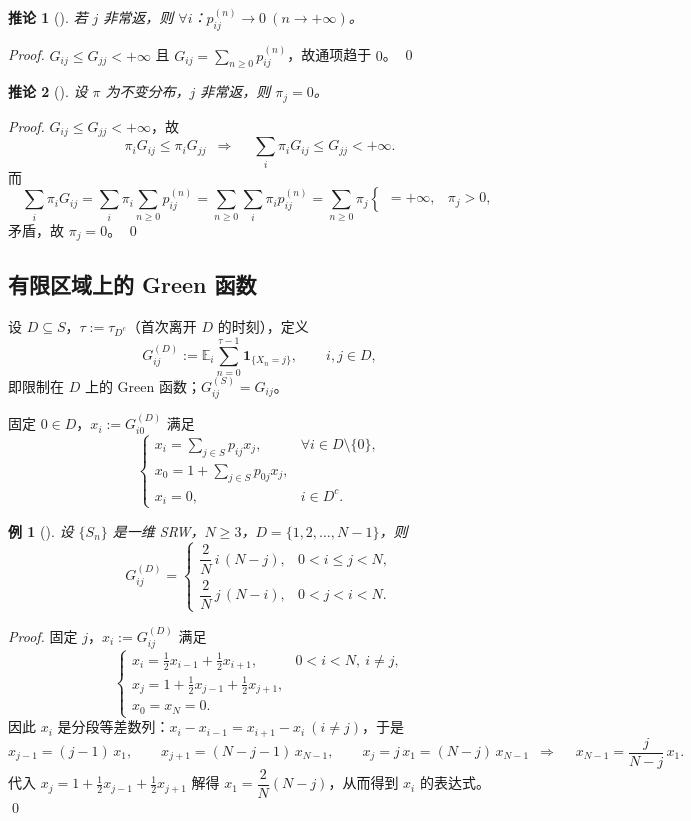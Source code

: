 \documentclass[lang=cn,10pt,newtx,thmcnt=chapter,mode=simple]{vividbook}
\providecommand{\E}{}\renewcommand{\E}{\mathbb{E}}
\newcommand{\ind}[1]{\mathbf{1}_{\{#1\}}}
\newcommand{\darr}{\;\Rightarrow\;}
\theoremstyle{vividthm}
\newtheorem*{vividcorollary}{推论}
\theoremstyle{vividdef}
\theoremstyle{vividexa}
\newtheorem*{vividexample}{例}
\theoremstyle{vividrem}
\renewenvironment{corollary}[1][]{\begin{vividcorollary}[#1]}{\end{vividcorollary}}
\newenvironment{example}[1][]{\begin{vividexample}[#1]}{\end{vividexample}}
\begin{document}
\begin{corollary}
若 $j$ 非常返，则 $\forall i$：$p_{ij}^{(n)}\to0\ (n\to+\infty)$。
\end{corollary}

\begin{proof}
$G_{ij}\le G_{jj}<+\infty$ 且 $G_{ij}=\sum_{n\ge0}p_{ij}^{(n)}$，故通项趋于 $0$。 \qed
\end{proof}

\begin{corollary}
设 $\pi$ 为不变分布，$j$ 非常返，则 $\pi_j=0$。
\end{corollary}

\begin{proof}
$G_{ij}\le G_{jj}<+\infty$，故
\[
\pi_iG_{ij}\le\pi_iG_{jj}
\ \darr\quad
\sum_i\pi_iG_{ij}\le G_{jj}<+\infty .
\]
而
\[
\sum_i\pi_iG_{ij}=\sum_i\pi_i\sum_{n\ge0}p_{ij}^{(n)}
=\sum_{n\ge0}\sum_i\pi_ip_{ij}^{(n)}
=\sum_{n\ge0}\pi_j
\begin{cases}
=+\infty, & \pi_j>0,
\end{cases}
\]
矛盾，故 $\pi_j=0$。 \qed
\end{proof}

\subsection{有限区域上的 Green 函数}

设 $D\subseteq S$，$\tau:=\tau_{D^c}$（首次离开 $D$ 的时刻），定义
\[
G_{ij}^{(D)}:=\E_i\sum_{n=0}^{\tau-1}\ind{X_n=j},\qquad i,j\in D,
\]
即限制在 $D$ 上的 Green 函数；$G_{ij}^{(S)}=G_{ij}$。

固定 $0\in D$，$x_i:=G_{i0}^{(D)}$ 满足
\[
\begin{cases}
x_i=\sum_{j\in S}p_{ij}x_j, & \forall i\in D\setminus\{0\},\\[0.2em]
x_0=1+\sum_{j\in S}p_{0j}x_j, &\\[0.2em]
x_i=0, & i\in D^c.
\end{cases}
\]

\begin{example}
设 $\{S_n\}$ 是一维 SRW，$N\ge3$，$D=\{1,2,\dots,N-1\}$，则
\[
G_{ij}^{(D)}=
\begin{cases}
\dfrac{2}{N}\,i\,(N-j), & 0<i\le j<N,\\[0.5em]
\dfrac{2}{N}\,j\,(N-i), & 0<j<i<N.
\end{cases}
\]
\end{example}

\begin{proof}
固定 $j$，$x_i:=G_{ij}^{(D)}$ 满足
\[
\begin{cases}
x_i=\frac12x_{i-1}+\frac12x_{i+1}, & 0<i<N,\ i\ne j,\\
x_j=1+\frac12x_{j-1}+\frac12x_{j+1}, &\\
x_0=x_N=0. &
\end{cases}
\]
因此 $x_i$ 是分段等差数列：$x_i-x_{i-1}=x_{i+1}-x_i\ (i\ne j)$，于是
\[
x_{j-1}=(j-1)\,x_1,\qquad x_{j+1}=(N-j-1)\,x_{N-1},
\qquad
x_j=j\,x_1=(N-j)\,x_{N-1}
\ \darr\quad x_{N-1}=\frac{j}{N-j}\,x_1 .
\]
代入 $x_j=1+\frac12x_{j-1}+\frac12x_{j+1}$ 解得 $x_1=\dfrac2N(N-j)$，从而得到 $x_i$ 的表达式。 \qed
\end{proof}
\end{document}
